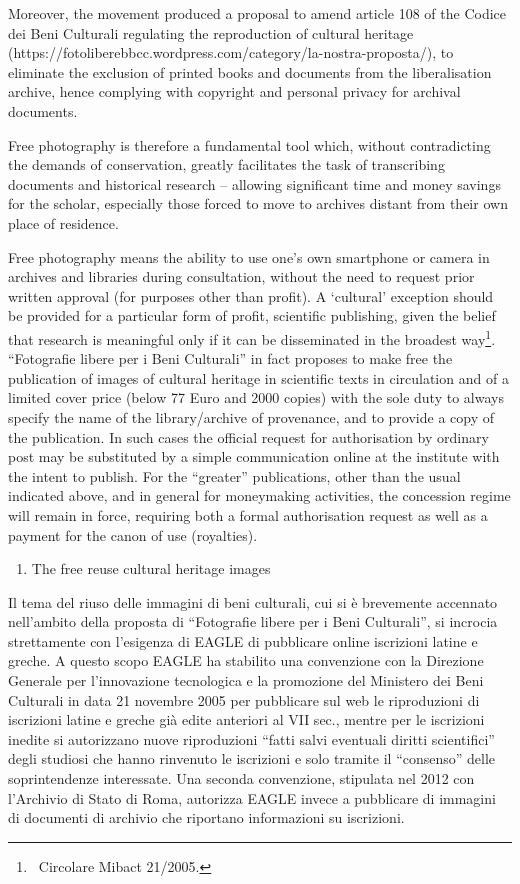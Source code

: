 \documentclass[amsthm,ebook]{saparticle}
\begin{document}
Moreover, the movement produced a proposal to amend article 108 of the Codice dei Beni Culturali regulating the
reproduction of cultural heritage (https://fotoliberebbcc.wordpress.com/category/la-nostra-proposta/), to eliminate the
exclusion of printed books and documents from the liberalisation archive, hence complying with copyright and personal
privacy for archival documents.

Free photography is therefore a fundamental tool which, without contradicting the demands of conservation, greatly
facilitates the task of transcribing documents and historical research – allowing significant time and money savings
for the scholar, especially those forced to move to archives distant from their own place of residence.

Free photography means the ability to use one’s own smartphone or camera in archives and libraries during consultation,
without the need to request prior written approval (for purposes other than profit). A ‘cultural’ exception should be
provided for a particular form of profit, scientific publishing, given the belief that research is meaningful only if
it can be disseminated in the broadest way\footnote{\ Circolare Mibact 21/2005.}. “Fotografie libere per i Beni
Culturali” in fact proposes to make free the publication of images of cultural heritage in scientific texts in
circulation and of a limited cover price (below 77 Euro and 2000 copies) with the sole duty to always specify the name
of the library/archive of provenance, and to provide a copy of the publication. In such cases the official request for
authorisation by ordinary post may be substituted by a simple communication online at the institute with the intent to
publish. For the “greater” publications, other than the usual indicated above, and in general for moneymaking
activities, the concession regime will remain in force, requiring both a formal authorisation request as well as a
payment for the canon of use (royalties).







\begin{enumerate}
\item The free reuse cultural heritage images
\end{enumerate}
Il tema del riuso delle immagini di beni culturali, cui si è brevemente accennato nell’ambito della proposta di
“Fotografie libere per i Beni Culturali”, si incrocia strettamente con l’esigenza di EAGLE di pubblicare online
iscrizioni latine e greche. A questo scopo EAGLE ha stabilito una convenzione con la Direzione Generale per
l’innovazione tecnologica e la promozione del Ministero dei Beni Culturali in data 21 novembre 2005 per pubblicare sul
web le riproduzioni di iscrizioni latine e greche già edite anteriori al VII sec., mentre per le iscrizioni inedite si
autorizzano nuove riproduzioni “fatti salvi eventuali diritti scientifici” degli studiosi che hanno rinvenuto le
iscrizioni e solo tramite il “consenso” delle soprintendenze interessate. Una seconda convenzione, stipulata nel 2012
con l’Archivio di Stato di Roma, autorizza EAGLE invece a pubblicare di immagini di documenti di archivio che riportano
informazioni su iscrizioni.
\end{document}

